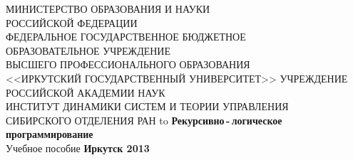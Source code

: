 \documentclass[12pt, openany, twoside]{book} %
\begin{document}
\def\chaptername{}
\def\thechapter{\arabic{chapter}.}
\def\thesection{\thechapter\arabic{section}.}
\def\thesubsection{\thesection\arabic{subsection}.}
\def\thesubsubsection{\thesubsection\arabic{subsubsection}.}
\def\thefigure{\thechapter\arabic{figure}.}
\def\thetable{\thechapter\arabic{table}.}
\def\emphbib#1{#1}


\fancyhf{} %
\fancyhead[RE]{\small \nouppercase{\leftmark}}
\fancyhead[LO]{\small \nouppercase{\rightmark}}
\fancyhead[RO,LE]{\small \thepage}
\renewcommand{\headrulewidth}{1pt}
\renewcommand{\footrulewidth}{0pt}%
\pagestyle{fancy}
\renewcommand{\chaptermark}[1]{\markboth{\MakeUppercase{\thechapter\ #1}}{}}
\renewcommand{\sectionmark}[1]{\markright{\MakeUppercase{\thesection\ #1}}{}}
\captionsetup[figure]{labelformat=simple,labelsep=space}
\captionsetup[table]{labelformat=simple,labelsep=newline,singlelinecheck=off,justification=raggedleft}
\begin{titlepage}
\thispagestyle{empty}
\begin{center}{\sc
МИНИСТЕРСТВО ОБРАЗОВАНИЯ И НАУКИ \\
РОССИЙСКОЙ ФЕДЕРАЦИИ \\
ФЕДЕРАЛЬНОЕ ГОСУДАРСТВЕННОЕ БЮДЖЕТНОЕ \\
ОБРАЗОВАТЕЛЬНОЕ УЧРЕЖДЕНИЕ \\
ВЫСШЕГО ПРОФЕССИОНАЛЬНОГО ОБРАЗОВАНИЯ\\
<<ИРКУТСКИЙ ГОСУДАРСТВЕННЫЙ УНИВЕРСИТЕТ>>
    УЧРЕЖДЕНИЕ РОССИЙСКОЙ АКАДЕМИИ НАУК \\
ИНСТИТУТ ДИНАМИКИ СИСТЕМ И ТЕОРИИ УПРАВЛЕНИЯ \\
СИБИРСКОГО ОТДЕЛЕНИЯ РАН
}
\vfill
\hbox to \linewidth{\hfill Е.~А.~Черкашин\hfill}
 \vspace{2em}
{\large\bf Рекурсивно\,-\,логическое программирование}\\
{Учебное пособие}
\vfill
\vfill
 \textbf{Иркутск 2013}
\end{center}
\end{titlepage}
\end{document}
